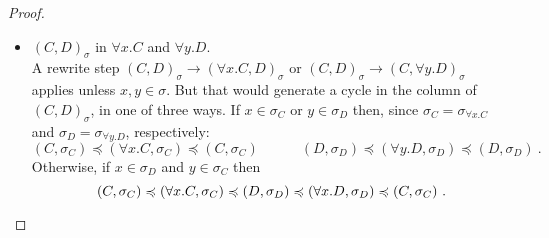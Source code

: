 \documentclass[UKenglish]{lipics-v2016}
\theoremstyle{plain}
\newcommand\+{+}
\renewcommand\*{\times}
\newcommand\dep{\preccurlyeq}
\newcommand\link[3][\sigma]{(#2,#3)_{#1}}
\newcommand\scoal{\rightarrow} %
\begin{document}
\begin{proof}
\begin{itemize}
	\item 
$\link CD$ in $\forall x.C$ and $\forall y.D$.
\\
A rewrite step $\link CD\scoal\link{\forall x.C}D$ or $\link CD\scoal\link C{\forall y.D}$ applies unless $x,y\in\sigma$. But that would generate a cycle in the column of $\link CD$, in one of three ways. If $x\in\sigma_C$ or $y\in\sigma_D$ then, since $\sigma_C=\sigma_{\forall x.C}$ and $\sigma_D=\sigma_{\forall y.D}$, respectively:
\[
	(C,\sigma_C)\dep(\forall x.C,\sigma_C)\dep(C,\sigma_C)
\qquad\quad
	(D,\sigma_D)\dep(\forall y.D,\sigma_D)\dep(D,\sigma_D)~.
\]
Otherwise, if $x\in\sigma_D$ and $y\in\sigma_C$ then
\[
	(C,\sigma_C)\dep(\forall x.C,\sigma_C)\dep(D,\sigma_D)\dep(\forall x.D,\sigma_D)\dep(C,\sigma_C)~.
\qedhere
\]
\end{itemize}
\end{proof}

\end{document}
